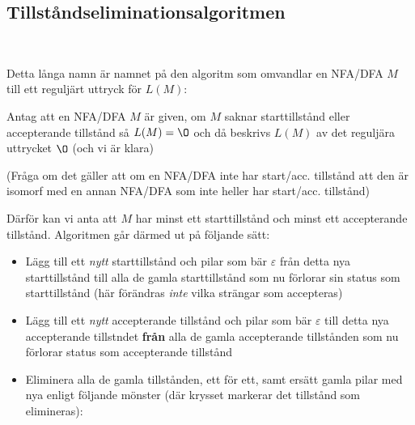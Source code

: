 \subsection{Tillståndseliminationsalgoritmen}\hfill\\\par
\noindent Detta långa namn är namnet på den algoritm som omvandlar en NFA/DFA $M$ till ett reguljärt uttryck för $L(M)$:
\par\bigskip
\noindent Antag att en NFA/DFA $M$ är given, om $M$ saknar starttillstånd eller accepterande tillstånd så $L(M) = \O$ och då beskrivs $L(M)$ av det reguljära uttrycket $\O$ (och vi är klara)\par\bigskip
(Fråga om det gäller att om en NFA/DFA inte har start/acc. tillstånd att den är isomorf med en annan NFA/DFA som inte heller har start/acc. tillstånd)
\par\bigskip
\noindent Därför kan vi anta att $M$ har minst ett starttillstånd och minst ett accepterande tillstånd.
\newpage
\noindent Algoritmen går därmed ut på följande sätt:
\begin{itemize}
  \item Lägg till ett \textit{nytt} starttillstånd och pilar som bär $\varepsilon$ från detta nya starttillstånd till alla de gamla starttillstånd som nu förlorar sin status som starttillstånd (här förändras \textit{inte} vilka strängar som accepteras)
  \item Lägg till ett \textit{nytt} accepterande tillstånd och pilar som bär $\varepsilon$ till detta nya accepterande tillstndet \textbf{från} alla de gamla accepterande tillstånden som nu förlorar status som accepterande tillstånd
  \item Eliminera alla de gamla tillstånden, ett för ett, samt ersätt gamla pilar med nya enligt följande mönster (där krysset markerar det tillstånd som elimineras):
\end{itemize}
\begin{figure}[ht]
    \centering
\end{figure}
